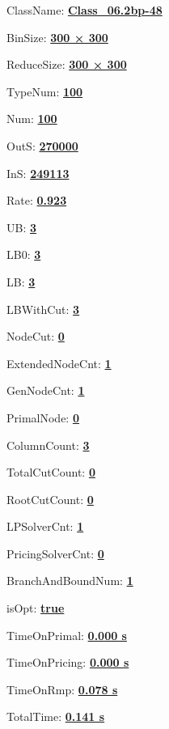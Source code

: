 \documentclass[11pt]{article}
\begin{document}
\pagestyle{empty}


ClassName: \underline{\textbf{Class_06.2bp-48}}
\par
BinSize: \underline{\textbf{300 × 300}}
\par
ReduceSize: \underline{\textbf{300 × 300}}
\par
TypeNum: \underline{\textbf{100}}
\par
Num: \underline{\textbf{100}}
\par
OutS: \underline{\textbf{270000}}
\par
InS: \underline{\textbf{249113}}
\par
Rate: \underline{\textbf{0.923}}
\par
UB: \underline{\textbf{3}}
\par
LB0: \underline{\textbf{3}}
\par
LB: \underline{\textbf{3}}
\par
LBWithCut: \underline{\textbf{3}}
\par
NodeCut: \underline{\textbf{0}}
\par
ExtendedNodeCnt: \underline{\textbf{1}}
\par
GenNodeCnt: \underline{\textbf{1}}
\par
PrimalNode: \underline{\textbf{0}}
\par
ColumnCount: \underline{\textbf{3}}
\par
TotalCutCount: \underline{\textbf{0}}
\par
RootCutCount: \underline{\textbf{0}}
\par
LPSolverCnt: \underline{\textbf{1}}
\par
PricingSolverCnt: \underline{\textbf{0}}
\par
BranchAndBoundNum: \underline{\textbf{1}}
\par
isOpt: \underline{\textbf{true}}
\par
TimeOnPrimal: \underline{\textbf{0.000 s}}
\par
TimeOnPricing: \underline{\textbf{0.000 s}}
\par
TimeOnRmp: \underline{\textbf{0.078 s}}
\par
TotalTime: \underline{\textbf{0.141 s}}
\par
\newpage
\end{document}
